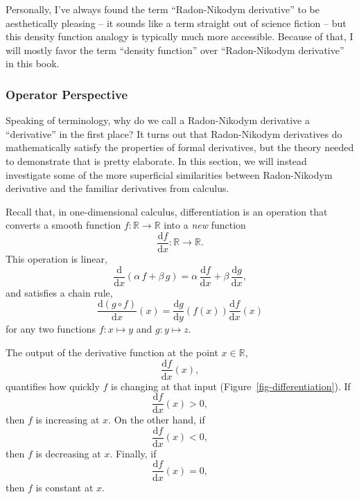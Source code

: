 \documentclass[
  letterpaper,
  DIV=11,
  numbers=noendperiod]{scrartcl}
\begin{document}
Personally, I've always found the term ``Radon-Nikodym derivative'' to
be aesthetically pleasing -- it sounds like a term straight out of
science fiction -- but this density function analogy is typically much
more accessible. Because of that, I will mostly favor the term ``density
function'' over ``Radon-Nikodym derivative'' in this book.

\subsubsection{Operator Perspective}\label{operator-perspective}

Speaking of terminology, why do we call a Radon-Nikodym derivative a
``derivative'' in the first place? It turns out that Radon-Nikodym
derivatives do mathematically satisfy the properties of formal
derivatives, but the theory needed to demonstrate that is pretty
elaborate. In this section, we will instead investigate some of the more
superficial similarities between Radon-Nikodym derivative and the
familiar derivatives from calculus.

Recall that, in one-dimensional calculus, differentiation is an
operation that converts a smooth function
\(f: \mathbb{R} \rightarrow \mathbb{R}\) into a \emph{new} function \[
\frac{ \mathrm{d} f }{ \mathrm{d} x} :
\mathbb{R} \rightarrow \mathbb{R}.
\] This operation is linear, \[
\frac{ \mathrm{d} }{ \mathrm{d} x}
\left( \alpha \, f + \beta \, g \right)
=
  \alpha \, \frac{ \mathrm{d} f }{ \mathrm{d} x}
+ \beta \, \frac{ \mathrm{d} g }{ \mathrm{d} x},
\] and satisfies a chain rule, \[
\frac{ \mathrm{d} (g \circ f)}{ \mathrm{d} x}(x)
=
\frac{ \mathrm{d} g}{ \mathrm{d} y}(f(x))
\frac{ \mathrm{d} f}{ \mathrm{d} x}(x)
\] for any two functions \(f: x \mapsto y\) and \(g: y \mapsto z\).

The output of the derivative function at the point \(x \in \mathbb{R}\),
\[
\frac{ \mathrm{d} f }{ \mathrm{d} x}(x),
\] quantifies how quickly \(f\) is changing at that input
(Figure~\ref{fig-differentiation}). If \[
\frac{ \mathrm{d} f }{ \mathrm{d} x}(x) > 0,
\] then \(f\) is increasing at \(x\). On the other hand, if \[
\frac{ \mathrm{d} f }{ \mathrm{d} x}(x) < 0,
\] then \(f\) is decreasing at \(x\). Finally, if \[
\frac{ \mathrm{d} f }{ \mathrm{d} x}(x) = 0,
\] then \(f\) is constant at \(x\).
\end{document}
